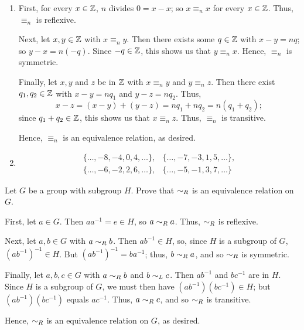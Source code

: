 \begin{solution}[print=false]
\begin{enumerate}
\item First, for every $x \in \mathbb{Z}$, $n$
    divides $0=x-x$; so $x\equiv_n x$ for every $x\in
    \mathbb{Z}$.  Thus, $\equiv_n$ is reflexive.

Next, let $x,y \in \mathbb{Z}$ with $x\equiv_n y$.  Then
there exists some $q\in \mathbb{Z}$ with $x-y=nq$; so $y-x=n(-q)$.
Since $-q\in \mathbb{Z}$, this shows us that $y\equiv_n x$.  Hence,
$\equiv_n$ is symmetric.

Finally, let $x,y$ and $z$ be in $\mathbb{Z}$ with $x\equiv_n
y$ and $y\equiv_nz$.  Then there exist $q_1,q_2 \in \mathbb{Z}$ with
$x-y=nq_1$ and $y-z=nq_2$.  Thus,
$$x-z=(x-y)+(y-z)=nq_1+nq_2=n(q_1+q_2);$$ since $q_1+q_2 \in \mathbb{Z}$,
this shows us that $x\equiv_n z$.  Thus, $\equiv_n$ is transitive.

Hence, $\equiv_n$ is an equivalence relation, as desired.

\item

\begin{align*} \{\ldots,-8,-4,0,4,\ldots\},&
\{\ldots,-7,-3,1,5,\ldots\},\\
\{\ldots,-6,-2,2,6,\ldots\},&
\{\ldots,-5,-1,3,7,\ldots\}\end{align*}
\end{enumerate}
\end{solution}

\begin{exercise} Let $G$ be a group with subgroup $H$. Prove that $\sim_R$ is an equivalence relation on $G$.
\end{exercise}

\begin{solution}[print=false]
First, let $a\in G$.  Then $aa^{-1}=e\in H$,
so $a\sim_R a$. Thus, $\sim_R$ is reflexive.

Next, let $a,b\in G$ with $a\sim_R b$.  Then
$ab^{-1}\in H$, so, since $H$ is a subgroup of $G$,
$(ab^{-1})^{-1}\in H$.  But
$(ab^{-1})^{-1}=ba^{-1}$; thus, $b\sim_R a$, and so $\sim_R$ is symmetric.

Finally, let $a,b,c\in G$ with $a\sim_R b$
and $b\sim_L c$. Then $ab^{-1}$ and $bc^{-1}$ are in $H$.  Since
$H$ is a subgroup of $G$, we must then have
$(ab^{-1})(bc^{-1})\in H$; but $(ab^{-1})(bc^{-1})$ equals
 $ac^{-1}$. Thus, $a\sim_R c$, and so $\sim_R$ is transitive.

Hence, $\sim_R$ is an equivalence relation on $G$, as desired.
\end{solution}

